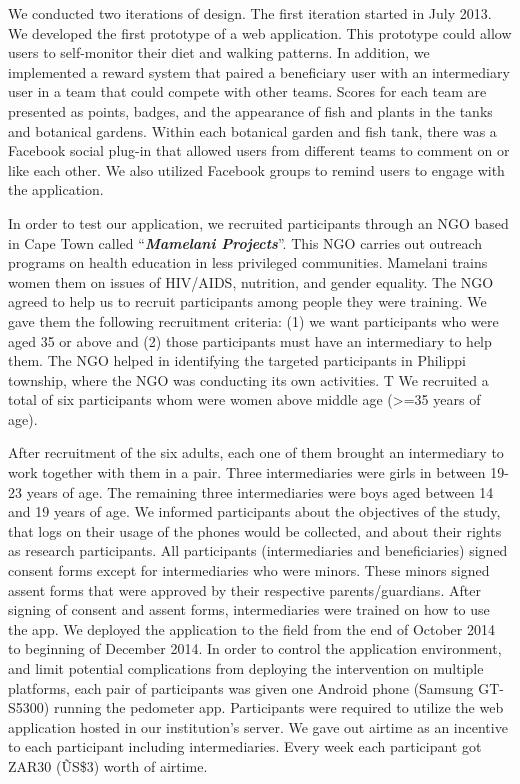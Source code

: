 \documentclass{sig-alternate}
\begin{document}
We conducted two iterations of design. The first iteration started in July
2013. We developed the first prototype of a web application. This prototype
could allow users to self-monitor their diet and walking patterns. In
addition, we implemented a reward system that paired a beneficiary user with
an intermediary user in a team that could compete with other teams. Scores for
each team are presented as points, badges, and the appearance of fish and plants
in the 
tanks and botanical gardens. Within each botanical garden and fish tank, there
was a Facebook social plug-in that allowed users from different teams to
comment on or like each other. We also utilized Facebook groups to remind
users to engage with the application.

In order to test our application, we recruited participants through an NGO
based in Cape Town called ``\textbf{\textit{Mamelani Projects}}''. This NGO
carries out outreach programs on health education in less privileged
communities. Mamelani trains women them on
issues of HIV/AIDS, nutrition, and gender equality. 
The NGO agreed to help us to recruit participants
among people they were training. We gave them the following recruitment
criteria: (1) we want participants who were aged 35 or above and (2) those
participants must have an intermediary to help them. The NGO helped in
identifying the targeted participants in Philippi township, where the
NGO was conducting its own activities. T We recruited a total of
six participants whom were women above middle age (>=35 years of age).

After recruitment of the six adults, each one of them brought an intermediary
to work together with them in a pair. Three intermediaries were girls in
between 19-23 years of age. The remaining three intermediaries were boys aged
between 14 and 19 years of age. 
We informed participants about the objectives of the study,
that logs on their usage of the phones would be collected, and about 
their rights as research participants.
All participants (intermediaries and
beneficiaries) signed consent forms except for intermediaries who were minors.
These minors signed assent forms that were approved by their respective
parents/guardians. 
After signing of consent and
assent forms, intermediaries were trained on how to use the app. We deployed
the application to the field from the end of October 2014 to beginning of
December 2014. In order to control the application environment, and limit 
potential complications from deploying the intervention on multiple platforms, 
each pair of participants was given one Android phone (Samsung
GT-S5300) running the pedometer app. Participants were required to utilize the
web application hosted in our institution's server. We gave out  airtime as an
incentive to each participant including intermediaries. Every week each
participant got ZAR30 (\~US\$3) worth of airtime.
\end{document}
